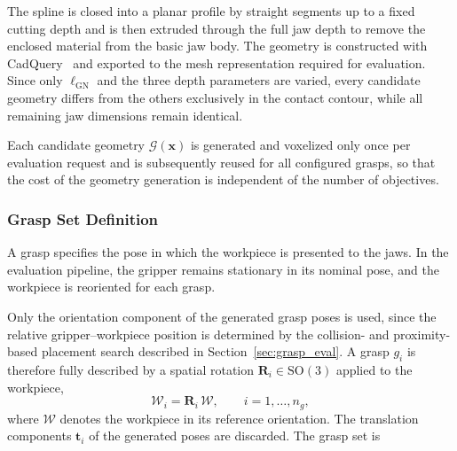 The spline is closed into a planar profile by straight segments up to a fixed cutting depth and is
then extruded through the full jaw depth to remove the enclosed material from the basic jaw body.
The geometry is constructed with CadQuery~\cite{cadquery2026} and exported to the mesh
representation required for evaluation. Since only $\ell_{\mathrm{GN}}$ and the three depth
parameters are varied, every candidate geometry differs from the others exclusively in the contact
contour, while all remaining jaw dimensions remain identical.

Each candidate geometry $\mathcal{G}(\mathbf{x})$ is generated and voxelized only once per
evaluation request and is subsequently reused for all configured grasps, so that the cost of the
geometry generation is independent of the number of objectives.


\subsubsection{Grasp Set Definition}
\label{sec:grasp_set}

A grasp specifies the pose in which the workpiece is presented to the jaws. In the evaluation
pipeline, the gripper remains stationary in its nominal pose, and the workpiece is reoriented for
each grasp.

Only the orientation component of the generated grasp poses is used, since the relative
gripper--workpiece position is determined by the collision- and proximity-based placement search
described in Section~\ref{sec:grasp_eval}. A grasp $g_i$ is therefore fully described by a spatial
rotation $\mathbf{R}_i \in \mathrm{SO}(3)$ applied to the workpiece,
\begin{equation}
    \mathcal{W}_i = \mathbf{R}_i\,\mathcal{W},
    \qquad
    i = 1,\ldots,n_g ,
\end{equation}
where $\mathcal{W}$ denotes the workpiece in its reference orientation. The translation components
$\mathbf{t}_i$ of the generated poses are discarded. The grasp set is

